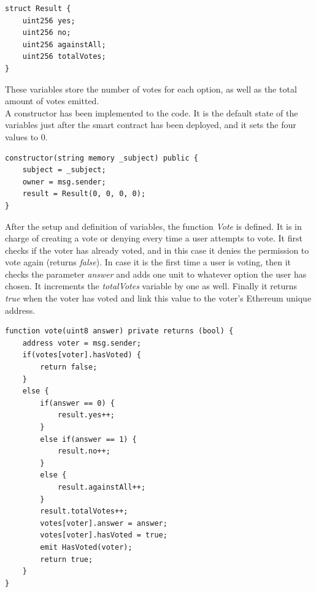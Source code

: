 \documentclass[10pt]{article}
\begin{document}
\begin{multicols}{2}
\begin{lstlisting}[language=Solidity, numbers=none]
struct Result {
	uint256 yes;
	uint256 no;
	uint256 againstAll;
	uint256 totalVotes;
}
\end{lstlisting}

These variables store the number of votes for each option, as well as the total amount of votes emitted.\\

A constructor has been implemented to the code. It is the default state of the variables just after the smart contract has been deployed, and it sets the four values to 0.\\

\begin{lstlisting}[language=Solidity, numbers=none]
constructor(string memory _subject) public {
	subject = _subject;
	owner = msg.sender;
	result = Result(0, 0, 0, 0);
}
\end{lstlisting}

After the setup and definition of variables, the function \textit{Vote} is defined. It is in charge of creating a vote or denying every time a user attempts to vote. It first checks if the voter has already voted, and in this case it denies the permission to vote again (returns \textit{false}). In case it is the first time a user is voting, then it checks the parameter \textit{answer} and adds one unit to whatever option the user has chosen. It increments the \textit{totalVotes} variable by one as well. Finally it returns \textit{true} when the voter has voted and link this value to the voter's Ethereum unique address.\\

\begin{lstlisting}[language=Solidity, numbers=none]
function vote(uint8 answer) private returns (bool) {
	address voter = msg.sender;
	if(votes[voter].hasVoted) {
		return false;
	}
	else {
		if(answer == 0) {
			result.yes++;
		}
		else if(answer == 1) {
			result.no++;
		}
		else {
			result.againstAll++;
		}
		result.totalVotes++;
		votes[voter].answer = answer;
		votes[voter].hasVoted = true;
		emit HasVoted(voter);
		return true;
	}
}
\end{lstlisting}



\end{multicols}
\end{document}
